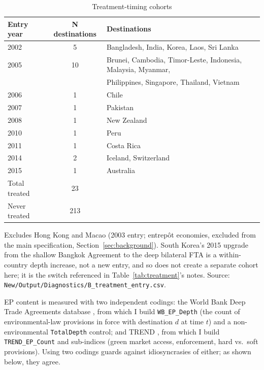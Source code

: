 \documentclass[12pt]{article}
\begin{document}
\begin{table}[htbp]
\centering
\caption{Treatment-timing cohorts}
\label{tab:cohorts}
\small
\begin{threeparttable}
\begin{tabular}{lcl}
\toprule
Entry year & N destinations & Destinations \\
\midrule
2002 & 5 & Bangladesh, India, Korea, Laos, Sri Lanka \\
2005 & 10 & Brunei, Cambodia, Timor-Leste, Indonesia, Malaysia, Myanmar,\\
 & & Philippines, Singapore, Thailand, Vietnam \\
2006 & 1 & Chile \\
2007 & 1 & Pakistan \\
2008 & 1 & New Zealand \\
2010 & 1 & Peru \\
2011 & 1 & Costa Rica \\
2014 & 2 & Iceland, Switzerland \\
2015 & 1 & Australia \\
\midrule
Total treated & 23 & \\
Never treated & 213 & \\
\bottomrule
\end{tabular}
\begin{tablenotes}\footnotesize
\item Excludes Hong Kong and Macao (2003 entry; entrep\^ot economies, excluded from the
main specification, Section~\ref{sec:background}). South Korea's 2015 upgrade from the
shallow Bangkok Agreement to the deep bilateral FTA is a within-country depth increase,
not a new entry, and so does not create a separate cohort here; it is the switch
referenced in Table~\ref{tab:treatment}'s notes. Source:
\texttt{New/Output/Diagnostics/B\_treatment\_entry.csv}.
\end{tablenotes}
\end{threeparttable}
\end{table}

EP content is measured with two independent codings: the World Bank Deep Trade
Agreements database \citep{hofmann2017}, from which I build \texttt{WB\_EP\_Depth} (the
count of environmental-law provisions in force with destination $d$ at time $t$) and a
non-environmental \texttt{TotalDepth} control; and TREND \citep{morin2018}, from which I
build \texttt{TREND\_EP\_Count} and sub-indices (green market access, enforcement, hard
vs.\ soft provisions). Using two codings guards against idiosyncrasies of either; as
shown below, they agree.
\end{document}
